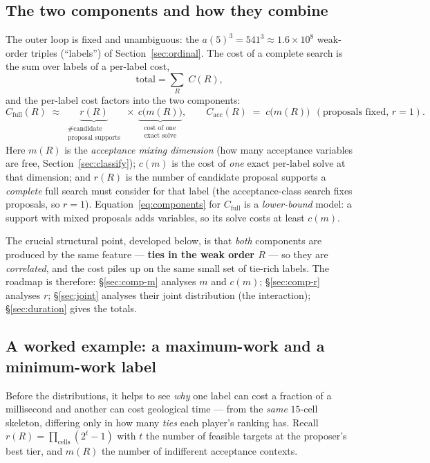 \documentclass[11pt]{article}
\begin{document}
\subsection{The two components and how they combine}
\label{sec:components}
The outer loop is fixed and unambiguous: the $a(5)^3=541^3\approx1.6\times10^8$
weak-order triples (``labels'') of Section~\ref{sec:ordinal}. The cost of a complete
search is the sum over labels of a per-label cost,
\[
\text{total}=\sum_{R}\;C(R),
\]
and the per-label cost factors into the two components:
\begin{equation}
\label{eq:components}
C_{\text{full}}(R)\;\approx\; \underbrace{r(R)}_{\substack{\text{\# candidate}\\\text{proposal supports}}}\ \times\ \underbrace{c\big(m(R)\big)}_{\substack{\text{cost of one}\\\text{exact solve}}},
\qquad
C_{\text{acc}}(R)\;=\;c\big(m(R)\big)\ \ (\text{proposals fixed, }r{=}1).
\end{equation}
Here $m(R)$ is the \emph{acceptance mixing dimension} (how many acceptance variables
are free, Section~\ref{sec:classify}); $c(m)$ is the cost of \emph{one} exact
per-label solve at that dimension; and $r(R)$ is the number of candidate proposal
supports a \emph{complete} full search must consider for that label (the
acceptance-class search fixes proposals, so $r{=}1$). Equation~\eqref{eq:components}
for $C_{\text{full}}$ is a \emph{lower-bound} model: a support with mixed proposals
adds variables, so its solve costs at least $c(m)$.

The crucial structural point, developed below, is that \emph{both} components are
produced by the same feature --- \textbf{ties in the weak order $R$} --- so they are
\emph{correlated}, and the cost piles up on the same small set of tie-rich labels.
The roadmap is therefore: \S\ref{sec:comp-m} analyses $m$ and $c(m)$;
\S\ref{sec:comp-r} analyses $r$; \S\ref{sec:joint} analyses their joint distribution
(the interaction); \S\ref{sec:duration} gives the totals.

\subsection{A worked example: a maximum-work and a minimum-work label}
\label{sec:worked}
Before the distributions, it helps to see \emph{why} one label can cost a fraction of
a millisecond and another can cost geological time --- from the \emph{same} $15$-cell
skeleton, differing only in how many \emph{ties} each player's ranking has. Recall
$r(R)=\prod_{\text{cells}}(2^{t}-1)$ with $t$ the number of feasible targets at the
proposer's best tier, and $m(R)$ the number of indifferent acceptance contexts.
\end{document}

